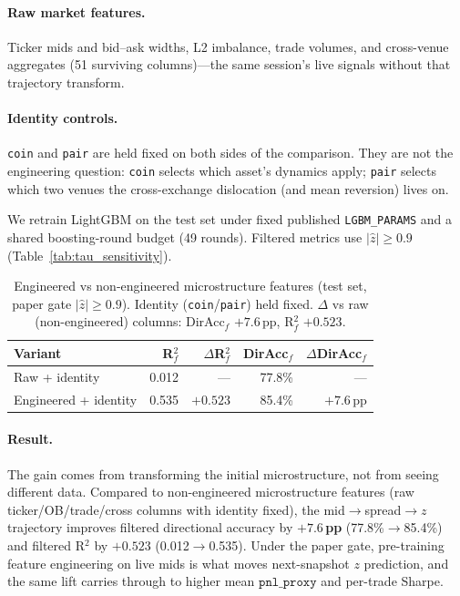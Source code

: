\paragraph{Raw market features.}
Ticker mids and bid--ask widths, L2 imbalance, trade volumes, and cross-venue
aggregates (51 surviving columns)---the same session's live signals without that
trajectory transform.

\paragraph{Identity controls.}
\texttt{coin} and \texttt{pair} are held fixed on both sides of the comparison.
They are not the engineering question: \texttt{coin} selects which asset's
dynamics apply; \texttt{pair} selects which two venues the cross-exchange
dislocation (and mean reversion) lives on.

We retrain LightGBM on the test set under fixed published
\texttt{LGBM\_PARAMS} and a shared boosting-round budget (49 rounds). Filtered
metrics use $|\hat{z}| \geq 0.9$ (Table~\ref{tab:tau_sensitivity}).

\begin{table}[t]
\caption{Engineered vs non-engineered microstructure features (test set,
paper gate $|\hat{z}|\geq 0.9$). Identity (\texttt{coin}/\texttt{pair}) held
fixed. $\Delta$ vs raw (non-engineered) columns: DirAcc$_f$ $+7.6$\,pp,
R$^2_f$ $+0.523$.}
\label{tab:fe_vs_raw}
\footnotesize
\setlength{\tabcolsep}{3.2pt}
\begin{tabular}{@{}lrrrr@{}}
\toprule
Variant & R$^2_f$ & $\Delta$R$^2_f$ & DirAcc$_f$ & $\Delta$DirAcc$_f$ \\
\midrule
Raw + identity        & 0.012 & --- & 77.8\% & --- \\
Engineered + identity & 0.535 & $+0.523$ & 85.4\% & $+7.6$\,pp \\
\bottomrule
\end{tabular}
\end{table}

\paragraph{Result.}
The gain comes from transforming the initial microstructure, not from seeing
different data. Compared to non-engineered microstructure features
(raw ticker/OB/trade/cross columns with identity fixed), the
mid$\to$spread$\to z$ trajectory improves filtered directional accuracy by
\textbf{$+7.6$\,pp} (77.8\%$\to$85.4\%) and filtered R$^2$ by
\textbf{$+0.523$} (0.012$\to$0.535). Under the paper gate, pre-training
feature engineering on live mids is what moves next-snapshot $z$ prediction,
and the same lift carries through to higher mean $\texttt{pnl\_proxy}$ and
per-trade Sharpe.
